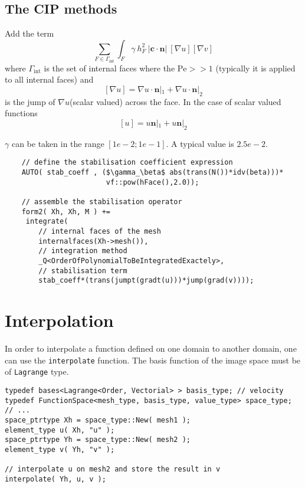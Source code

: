 \subsection{The CIP methods}
  Add the term
  \begin{equation}
    \label{notes:eq:47}
    \sum_{F \in \Gamma_\mathrm{int} } \int_{F} \gamma\ h_F^2\ |\mathbf{c} \cdot \mathbf{n}|\  [\nabla u]  [\nabla v]
  \end{equation}
  where $\Gamma_\mathrm{int}$ is the set of internal faces where the
  $\mathrm{Pe}>>1$ (typically it is applied to all internal faces) and
  \begin{equation}
    \label{notes:eq:50}
    [\nabla u] = \nabla u \cdot \mathbf{n}|_1 + \nabla u \cdot \mathbf{n}|_2
  \end{equation}
  is the jump of $\nabla u$(scalar valued) across the face.  In the
  case of scalar valued functions
  \begin{equation}
    \label{notes:eq:53}
    [u] = u \mathbf{n}|_1 + u \mathbf{n}|_2
  \end{equation}
  \begin{remark}
    $\gamma$ can be taken in the range $[1e-2;1e-1]$. A typical value is $2.5e-2$.
  \end{remark}


\begin{lstlisting}
    // define the stabilisation coefficient expression
    AUTO( stab_coeff , ($\gamma_\beta$ abs(trans(N())*idv(beta)))*
                        vf::pow(hFace(),2.0));

    // assemble the stabilisation operator
    form2( Xh, Xh, M ) +=
     integrate(
        // internal faces of the mesh
        internalfaces(Xh->mesh()),
        // integration method
        _Q<OrderOfPolynomialToBeIntegratedExactely>,
        // stabilisation term
        stab_coeff*(trans(jumpt(gradt(u)))*jump(grad(v))));
\end{lstlisting}

\section{Interpolation}

In order to interpolate a function defined on one domain to another domain, one
can use the \lstinline{interpolate} function. The basis function of the image
space must be of \lstinline{Lagrange} type.

\begin{lstlisting}
typedef bases<Lagrange<Order, Vectorial> > basis_type; // velocity
typedef FunctionSpace<mesh_type, basis_type, value_type> space_type;
// ...
space_ptrtype Xh = space_type::New( mesh1 );
element_type u( Xh, "u" );
space_ptrtype Yh = space_type::New( mesh2 );
element_type v( Yh, "v" );

// interpolate u on mesh2 and store the result in v
interpolate( Yh, u, v );
\end{lstlisting}

